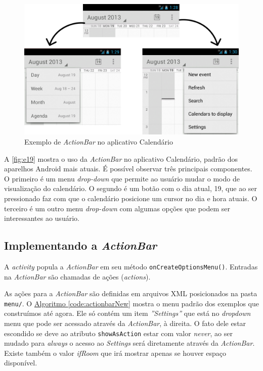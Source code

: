 \documentclass[a4paper,12pt,brazil,oneside]{book}
\begin{document}
	\begin{figure}[H]
	  \centering
	  \includegraphics[width=.8\textwidth]{figuras/design/actionbar-ex.jpg}
	  \caption{Exemplo de \emph{ActionBar} no aplicativo Calendário}
	  \label{fig:e19}
	\end{figure}
	
	A \autoref{fig:e19} mostra o uso da \emph{ActionBar} no aplicativo Calendário, padrão dos aparelhos Android mais atuais. É possível observar três principais componentes. O primeiro é um menu \emph{drop-down} que permite ao usuário mudar o modo de visualização do calendário. O segundo é um botão com o dia atual, 19, que ao ser pressionado faz com que o calendário posicione um cursor no dia e hora atuais. O terceiro é um outro menu \emph{drop-down} com algumas opções que podem ser interessantes ao usuário.
	
	\subsection{Implementando a \emph{ActionBar}}
	
		A \emph{activity} popula a \emph{ActionBar} em seu método \texttt{onCreateOptionsMenu()}. Entradas na \emph{ActionBar} são chamadas de ações (\emph{actions}). 
		
		As ações para a \emph{ActionBar} são definidas em arquivos XML posicionados na pasta \texttt{menu/}. O \hyperref[code:actionbarNew]{Algoritmo \ref*{code:actionbarNew}} mostra o menu padrão dos exemplos que construímos até agora. Ele só contém um item \emph{''Settings''} que está no \emph{dropdown} menu que pode ser acessado através da \emph{ActionBar}, à direita. O fato dele estar escondido se deve ao atributo \texttt{showAsAction} estar com valor \emph{never}, ao ser mudado para \emph{always} o acesso ao \emph{Settings} será diretamente através da \emph{ActionBar}. Existe também o valor \emph{ifRoom} que irá mostrar apenas se houver espaço disponível.
		
\end{document}
